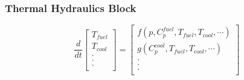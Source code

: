 \begin{frame}[fragile]
  \frametitle{Thermal Hydraulics Block}
  \footnotesize{
  \begin{equation} 
  \frac{d}{dt}\left[
    \begin{array}{c}
      T_{fuel}\\
      T_{cool}\\
      .\\
      .\\
      .\\
    \end{array}
    \right]
    =
    \left[
      \begin{array}{ c }
        f(p, C_p^{fuel}, T_{fuel}, T_{cool},\cdots)\\
        g(C_p^{cool}, T_{fuel}, T_{cool},\cdots)\\
        .\\
        .\\
        .\\
      \end{array}
      \right]
      \label{eqn:th_prke}
    \end{equation}
  
  }
\end{frame}


